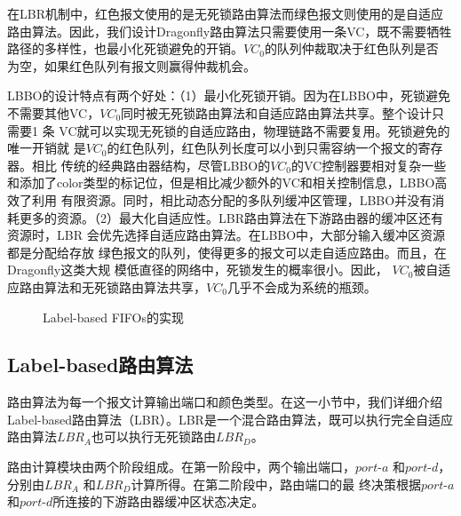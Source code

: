 在LBR机制中，红色报文使用的是无死锁路由算法而绿色报文则使用的是自适应
路由算法。因此，我们设计Dragonfly路由算法只需要使用一条VC，既不需要牺牲
路径的多样性，也最小化死锁避免的开销。$VC_0$的队列仲裁取决于红色队列是否
为空，如果红色队列有报文则赢得仲裁机会。

LBBO的设计特点有两个好处：（1）最小化死锁开销。因为在LBBO中，死锁避免不需要其他VC，$VC_0$同时被无死锁路由算法和自适应路由算法共享。整个设计只需要1 条
VC就可以实现无死锁的自适应路由，物理链路不需要复用。死锁避免的唯一开销就
是$VC_0$的红色队列，红色队列长度可以小到只需容纳一个报文的寄存器。相比
传统的经典路由器结构，尽管LBBO的$VC_0$的VC控制器要相对复杂一些和添加了color类型的标记位，但是相比减少额外的VC和相关控制信息，LBBO高效了利用
有限资源。同时，相比动态分配的多队列缓冲区管理，LBBO并没有消耗更多的资源。（2）最大化自适应性。LBR路由算法在下游路由器的缓冲区还有资源时，LBR
会优先选择自适应路由算法。在LBBO中，大部分输入缓冲区资源都是分配给存放
绿色报文的队列，使得更多的报文可以走自适应路由。而且，在Dragonfly这类大规
模低直径的网络中，死锁发生的概率很小。因此，
$VC_0$被自适应路由算法和无死锁路由算法共享，$VC_0$几乎不会成为系统的瓶颈。

\begin{figure}[t]
  \centering
  \caption{Label-based FIFOs的实现}
  \label{fig:grbofifos}
\end{figure}

\subsection{Label-based路由算法}


路由算法为每一个报文计算输出端口和颜色类型。在这一小节中，我们详细介绍
Label-based路由算法（LBR）。LBR是一个混合路由算法，既可以执行完全自适应路由算法$LBR_A$也可以执行无死锁路由$LBR_D$。

路由计算模块由两个阶段组成。在第一阶段中，两个输出端口，$port\textrm{-}a$ 和$port\textrm{-}d$，分别由$LBR_A$ 和$LBR_D$计算所得。在第二阶段中，路由端口的最
终决策根据$port\textrm{-}a$和$port\textrm{-}d$所连接的下游路由器缓冲区状态决定。


